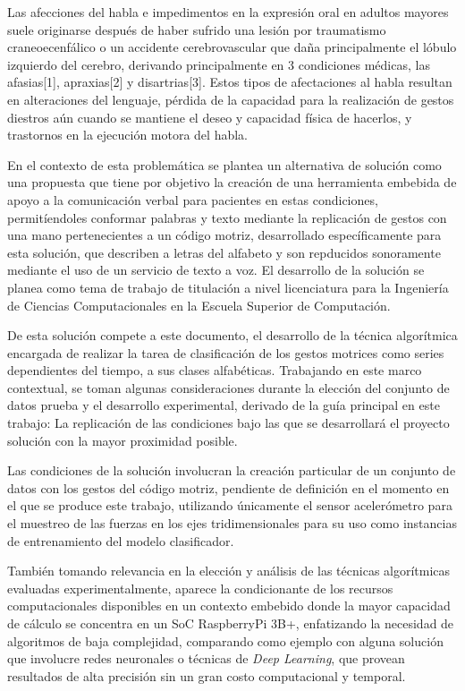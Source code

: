 \hfill\break
\justifying
Las afecciones del habla e impedimentos en la expresión oral en adultos mayores suele originarse después de haber sufrido una lesión por traumatismo craneoecenfálico o un accidente cerebrovascular que daña principalmente el lóbulo izquierdo del cerebro, derivando principalmente en 3 condiciones médicas, las afasias[1], apraxias[2] y disartrias[3]. Estos tipos de afectaciones al habla resultan en alteraciones del lenguaje, pérdida de la capacidad para la realización de gestos diestros aún cuando se mantiene el deseo y capacidad física de hacerlos, y trastornos en la ejecución motora del habla.

\hfill\break
\justifying
En el contexto de esta problemática se plantea un alternativa de solución como una propuesta que tiene por objetivo la creación de una herramienta embebida de apoyo a la comunicación verbal para pacientes en estas condiciones, permitíendoles conformar palabras y texto mediante la replicación de gestos con una mano pertenecientes a un código motriz, desarrollado específicamente para esta solución, que describen a letras del alfabeto y son repducidos sonoramente mediante el uso de un servicio de texto a voz. El desarrollo de la solución se planea como tema de trabajo de titulación a nivel licenciatura para la Ingeniería de Ciencias Computacionales en la Escuela Superior de Computación.

\hfill\break
\justifying
De esta solución compete a este documento, el desarrollo de la técnica algorítmica encargada de realizar la tarea de clasificación de los gestos motrices como series dependientes del tiempo, a sus clases alfabéticas. Trabajando en este marco contextual, se toman algunas consideraciones durante la elección del conjunto de datos prueba y el desarrollo experimental, derivado de la guía principal en este trabajo: La replicación de las condiciones bajo las que se desarrollará el proyecto solución con la mayor proximidad posible.

\hfill\break
\justifying
Las condiciones de la solución involucran la creación particular de un conjunto de datos con los gestos del código motriz, pendiente de definición en el momento en el que se produce este trabajo, utilizando únicamente el sensor acelerómetro para el muestreo de las fuerzas en los ejes tridimensionales para su uso como instancias de entrenamiento del modelo clasificador. 

\hfill\break
\justifying
También tomando relevancia en la elección y análisis de las técnicas algorítmicas evaluadas experimentalmente, aparece la condicionante de los recursos computacionales disponibles en un contexto embebido donde la mayor capacidad de cálculo se concentra en un SoC RaspberryPi 3B+, enfatizando la necesidad de algoritmos de baja complejidad, comparando como ejemplo con alguna solución que involucre redes neuronales o técnicas de \textit{Deep Learning}, que provean resultados de alta precisión sin un gran costo computacional y temporal.